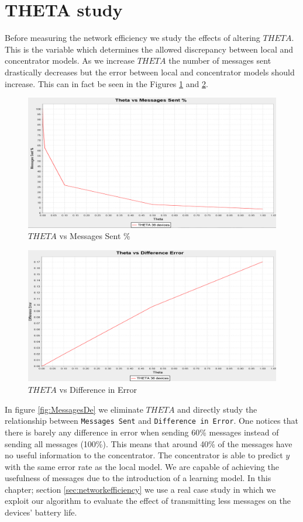 \documentclass{mproj}
\begin{document}
\section{THETA study}
Before measuring the network efficiency we study the effects of altering $THETA$. This is the variable which determines the allowed discrepancy between local and concentrator models. As we increase $THETA$ the number of messages sent drastically decreases but the error between local and concentrator models should increase. This can in fact be seen in the Figures \ref{fig:ThetaMessages} and \ref{fig:ThetaDE}.

\begin{figure}[H]
\caption{$THETA$ vs Messages Sent \%}
\label{fig:ThetaMessages}
\centerline{\includegraphics[scale=0.3]{ThetaMessages}}
\end{figure}

\begin{figure}[H]
\caption{$THETA$ vs Difference in Error}
\label{fig:ThetaDE}
\centerline{\includegraphics[scale=0.3]{ThetaDE}}
\end{figure}

In figure \ref{fig:MessagesDe} we eliminate $THETA$ and directly study the relationship between \texttt{Messages Sent} and \texttt{Difference in Error}. One notices that there is barely any difference in error when sending 60\% messages instead of sending all messages (100\%). This means that around 40\% of the messages have no useful information to the concentrator. The concentrator is able to predict $y$ with the same error rate as the local model. We are capable of achieving the usefulness of messages due to the introduction of a learning model. In this chapter; section \ref{sec:networkefficiency} we use a real case study in which we exploit our algorithm to evaluate the effect of transmitting less messages on the devices' battery life.
\end{document}
